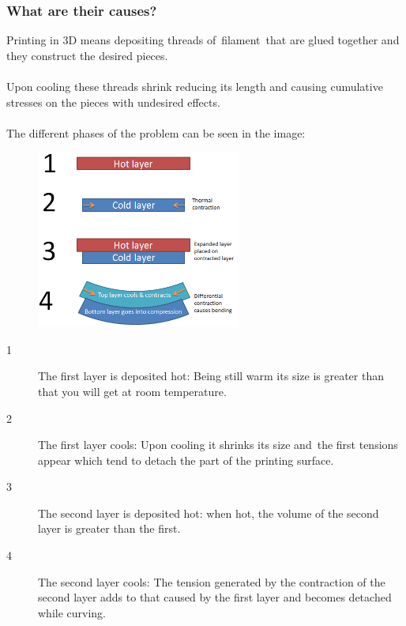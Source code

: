 \documentclass[11pt,a4paper]{article}
\begin{document}
		\subsubsection{What are their causes?}Printing in 3D means depositing threads of filament that are glued together and they construct the desired pieces.
\\\\
Upon cooling these threads shrink reducing its length and causing cumulative stresses on the pieces with undesired effects.
\\\\
The different phases of the problem can be seen in the image:
\begin{figure}[H]
\centering
\includegraphics[width=0.6\textwidth,cfbox=azul_marcos 4pt 0pt]{FOTOS/CAUSA_WARPING_1}
\end{figure}

\begin{description}
\item[1] The first layer is deposited hot: Being still warm its size is greater than that you will get at room temperature.
\item[2] The first layer cools: Upon cooling it shrinks its size and the first tensions appear which tend to detach the part of the printing surface.
\item[3] The second layer is deposited hot: when hot, the volume of the second layer is greater than the first.
\item[4] The second layer cools: The tension generated by the contraction of the second layer adds to that caused by the first layer and becomes detached while curving.
\end{description}
\end{document}
